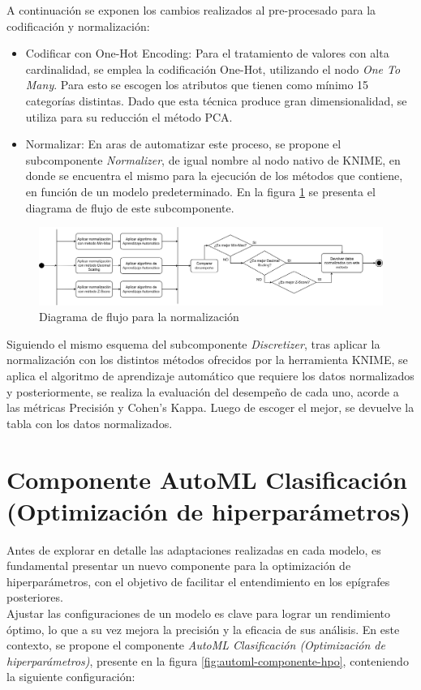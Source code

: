 A continuación se exponen los cambios realizados al pre-procesado para la codificación y normalización:

\begin{itemize}
	\item Codificar con One-Hot Encoding: Para el tratamiento de valores con alta cardinalidad, se emplea la codificación One-Hot, utilizando el nodo \textit{One To Many}. Para esto se escogen los atributos que tienen como mínimo 15 categorías distintas. Dado que esta técnica produce gran dimensionalidad, se utiliza para su reducción el método PCA.
	\item Normalizar: En aras de automatizar este proceso, se propone el subcomponente \textit{Normalizer}, de igual nombre al nodo nativo de KNIME, en donde se encuentra el mismo para la ejecución de los métodos que contiene, en función de un modelo predeterminado. En la figura \ref{fig:normalizacion} se presenta el diagrama de flujo de este subcomponente. 
\end{itemize}


\begin{figure}[H]
	\centering
	\includegraphics[width=1\linewidth]{"figuras/capi 2/preprocesado/normalizacion.drawio"}
	\caption{Diagrama de flujo para la normalización}
	\label{fig:normalizacion}
\end{figure}

Siguiendo el mismo esquema del subcomponente \textit{Discretizer}, tras aplicar la normalización con los distintos métodos ofrecidos por la herramienta KNIME, se aplica el algoritmo de aprendizaje automático que requiere los datos normalizados y posteriormente, se realiza la evaluación del desempeño de cada uno, acorde a las métricas Precisión y Cohen's Kappa. Luego de escoger el mejor, se devuelve la tabla con los datos normalizados.


\section{Componente AutoML Clasificación (Optimización de hiperparámetros)}
Antes de explorar en detalle las adaptaciones realizadas en cada modelo, es fundamental presentar un nuevo componente para la optimización de hiperparámetros, con el objetivo de facilitar el entendimiento en los epígrafes posteriores. \\
Ajustar las configuraciones de un modelo es clave para lograr un rendimiento óptimo, lo que a su vez mejora la precisión y la eficacia de sus análisis. En este contexto, se propone el componente \textit{AutoML Clasificación (Optimización de hiperparámetros)},  presente en la figura \ref{fig:automl-componente-hpo}, conteniendo la siguiente configuración:


